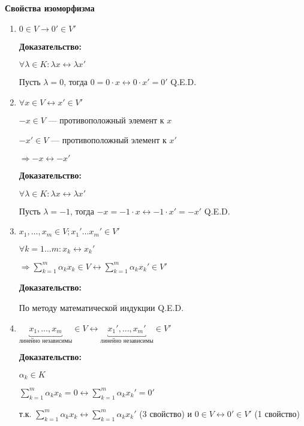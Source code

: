 \textbf{Свойства изоморфизма}

\begin{enumerate}
    \item \(0 \in V \longrightarrow 0' \in V'\)

          \textbf{Доказательство:}

          \(\forall \lambda \in K: \lambda x \longleftrightarrow \lambda x'\)

          Пусть \(\lambda = 0\), тогда \(0 = 0 \cdot x \longleftrightarrow 0 \cdot x' = 0'\)
          \hfill Q.E.D.

    \item \(\forall x \in V \longleftrightarrow x' \in V'\)

          \(-x \in V\) --- противоположный элемент к \(x\)

          \(-x' \in V\) --- противоположный элемент к \(x'\)

          \(\Rightarrow -x \longleftrightarrow -x'\)

          \textbf{Доказательство:}

          \(\forall \lambda \in K: \lambda x \longleftrightarrow \lambda x'\)

          Пусть \(\lambda = -1\), тогда \(-x = -1 \cdot x \longleftrightarrow -1 \cdot x' = -x'\)
          \hfill Q.E.D.

    \item
          \(x_1, \ldots, x_m \in V; x_1' \ldots x_m' \in V'\)

          \(\forall k = 1 \ldots m: x_k \longleftrightarrow x_k'\)

          \(\Rightarrow \sum\limits_{k = 1}^{m} \alpha_k x_k \in V \longleftrightarrow \sum\limits_{k = 1}^{m} \alpha_k x_k' \in V'\)

          \textbf{Доказательство:}

          По методу математической индукции
          \hfill Q.E.D.

    \item \(\underbracket{x_1, \ldots
              , x_m}_{\text{линейно независимы}} \in V \longleftrightarrow \underbracket{x_1', \ldots, x_m'}_{\text{линейно независимы}} \in V'\)

          \textbf{Доказательство:}

          \(\alpha_k \in K\)

          \(\sum\limits_{k = 1}^{m} \alpha_k x_k = 0 \longleftrightarrow \sum\limits_{k = 1}^{m} \alpha_k x_k' = 0'\)

          т.к. \(\sum\limits_{k = 1}^{m} \alpha_k x_k \longleftrightarrow \sum\limits_{k = 1}^{m} \alpha_k x_k'\) (3 свойство) и \(0 \in V \longleftrightarrow 0' \in V'\) (1 свойство)


\end{enumerate}
